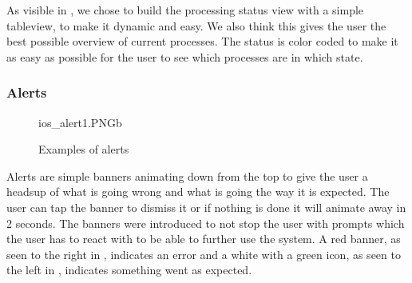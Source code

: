 As visible in , we chose to build the processing status view with a simple tableview, to make it dynamic and easy. We also think this gives the user the best possible overview of current processes. The status is color coded to make it as easy as possible for the user to see which processes are in which state. 

\subsubsection{Alerts}
\begin{figure}[ht]
		{ios_alert1.PNG}{b}
\caption{Examples of alerts}
\label{fig:ios_alerts}
\end{figure}
\FloatBarrier

Alerts are simple banners animating down from the top to give the user a headsup of what is going wrong and what is going the way it is expected. The user can tap the banner to dismiss it or if nothing is done it will animate away in 2 seconds. The banners were introduced to not stop the user with prompts which the user has to react with to be able to further use the system. A red banner, as seen to the right in , indicates an error and a white with a green icon, as seen to the left in , indicates something went as expected. 
